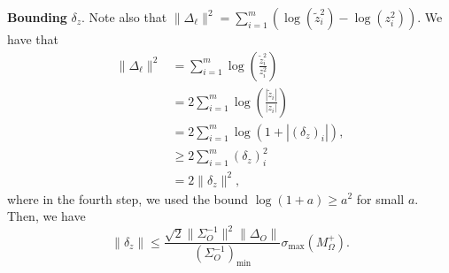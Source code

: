 \documentclass[letterpaper]{article}
\begin{document}
\begin{appendix}
{\bf Bounding} $\delta_z$. Note also that $\|\Delta_{\ell}\|^2 = \sum_{i=1}^m (\log(\tilde{z}_i^2)-\log(z_i^2))$. We have that
\begin{align*}
\|\Delta_{\ell}\|^2 &= \sum_{i=1}^m \log \left( \frac{\tilde{z}_i^2}{z_i^2} \right) \\
&=2 \sum_{i=1}^m \log \left( \frac{|\tilde{z}_i|}{|z_i|} \right) \\
&= 2 \sum_{i=1}^m \log (1+|(\delta_z)_i|),\\
& \geq 2 \sum_{i=1}^m (\delta_z)_i^2 \\
&= 2\|\delta_z\|^2,
\end{align*}
where in the fourth step, we used the bound $\log(1+a) \geq a^2$ for small $a$. Then, we have
\begin{equation}
\|\delta_z\| \leq \frac{ \sqrt{2}\|\Sigma_O^{-1}\|^2 \|\Delta_O\|}{(\Sigma_O^{-1})_{\min}} \sigma_{\max}(M_\Omega^+).
\label{eq:dzbound}
\end{equation}
 

\end{appendix}
\end{document}
